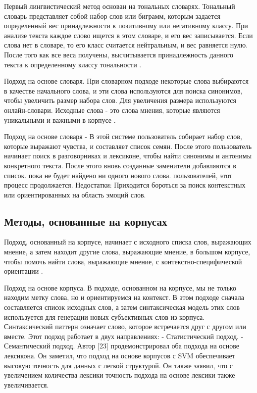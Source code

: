 Первый лингвистический метод основан на тональных словарях. Тональный словарь
представляет собой набор слов или биграмм, которым задается определенный вес
принадлежности к позитивному или негативному классу. При анализе текста каждое
слово ищется в этом словаре, и его вес записывается. Если слова нет в словаре,
то его класс считается нейтральным, и вес равняется нулю. После того как все
веса получены, высчитывается принадлежность данного текста к определенному
классу тональности \cite{article14}.

Подход на основе словаря. При словарном подходе некоторые слова выбираются в
качестве начального слова, и эти слова используются для поиска синонимов, чтобы
увеличить размер набора слов. Для увеличения размера используются
онлайн-словари. Исходные слова - это слова мнения, которые являются уникальными
и важными в корпусе \cite{article16}.

Подход на основе словаря - В этой системе пользователь собирает набор слов,
которые выражают чувства, и составляет список семян. После этого пользователь
начинает поиск в разговорниках и лексиконе, чтобы найти синонимы и антонимы
конкретного текста. После этого вновь созданные заменители добавляются в список.
пока не будет найдено ни одного нового слова. пользователей, этот процесс
продолжается.  Недостатки: Приходится бороться за поиск контекстных или
ориентированных на область эмоций слов. \cite{article18}


\subsection{Методы, основанные на корпусах}

Подход, основанный на корпусе, начинает с исходного списка слов, выражающих
мнение, а затем находит другие слова, выражающие мнение, в большом корпусе,
чтобы помочь найти слова, выражающие мнение, с контекстно-специфической
ориентации \cite{article2}.

Подход на основе корпуса. В подходе, основанном на корпусе, мы не только находим
метку слова, но и ориентируемся на контекст. В этом подходе сначала составляется
список исходных слов, а затем синтаксическая модель этих слов используется для
генерации новых субъективных слов из корпуса. Синтаксический паттерн означает
слово, которое встречается друг с другом или вместе. Этот подход работает в двух
направлениях:
- Статистический подход.
- Семантический подход.
Автор [23] продемонстрировал оба подхода на основе лексикона. Он заметил, что
подход на основе корпусов с SVM обеспечивает высокую точность для данных с
легкой структурой. Он также заявил, что с увеличением количества лексики
точность подхода на основе лексики также увеличивается.\cite{article16}

